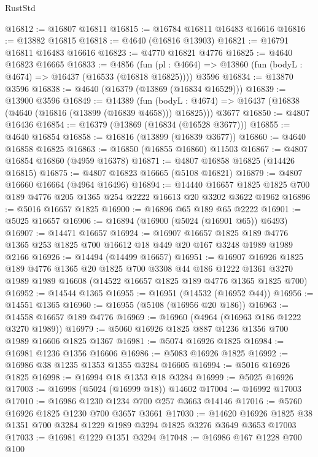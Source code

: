 \begin{lexlean}{RustStd}
\begin{coremodule}
@16812 := @16807 @16811
@16815 := @16784 @16811 @16483 @16616
@16816 := @13882 @16815
@16818 := @4640 (@16816 @13903)
@16821 := @16791 @16811 @16483 @16616
@16823 := @4770 @16821 @4776
@16825 := @4640 @16823 @16665
@16833 := @4856
    (fun (pl : @4664) => @13860 (fun (bodyL : @4674) => @16437 (@16533 (@16818 @16825))))
    @3596
@16834 := @13870 @3596
@16838 := @4640 (@16379 (@13869 (@16834 @16529)))
@16839 := @13900 @3596
@16849 := @14389
    (fun (bodyL : @4674) => @16437 (@16838 (@4640 (@16816 (@13899 (@16839 @4658))) @16825)))
    @3677
@16850 := @4807 @16436
@16854 := @16379 (@13869 (@16834 (@16528 @3677)))
@16855 := @4640 @16854
@16858 := @16816 (@13899 (@16839 @3677))
@16860 := @4640 @16858 @16825
@16863 := @16850 (@16855 @16860) @11503
@16867 := @4807 @16854 @16860 (@4959 @16378)
@16871 := @4807 @16858 @16825 (@14426 @16815)
@16875 := @4807 @16823 @16665 (@5108 @16821)
@16879 := @4807 @16660 @16664 (@4964 @16496)
@16894 := @14440
    @16657
    @1825
    @1825
    @700
    @189
    @4776
    @205
    @1365
    @254
    @2222
    @16613
    @20
    @3202
    @3622
    @1962
@16896 := @5016 @16657 @1825
@16900 := @16896 @65 @189 @65 @2222
@16901 := @5025 @16657
@16906 := @16894 (@16900 (@5024 (@16901 @65)) @6493)
@16907 := @14471 @16657
@16924 := @16907
    @16657
    @1825
    @189
    @4776
    @1365
    @253
    @1825
    @700
    @16612
    @18
    @449
    @20
    @167
    @3248
    @1989
    @1989
    @2166
@16926 := @14494 (@14499 @16657)
@16951 := @16907
    @16926
    @1825
    @189
    @4776
    @1365
    @20
    @1825
    @700
    @3308
    @44
    @186
    @1222
    @1361
    @3270
    @1989
    @1989
    @16608
    (@14522 @16657 @1825 @189 @4776 @1365 @1825 @700)
@16952 := @14544 @1365
@16955 := @16951 (@14532 (@16952 @44))
@16956 := @14551 @1365
@16960 := @16955 (@5108 (@16956 @20 @186))
@16963 := @14558 @16657 @189 @4776
@16969 := @16960 (@4964 (@16963 @186 @1222 @3270 @1989))
@16979 := @5060 @16926 @1825 @887 @1236 @1356 @700 @1989 @16606 @1825 @1367
@16981 := @5074 @16926 @1825
@16984 := @16981 @1236 @1356 @16606
@16986 := @5083 @16926 @1825
@16992 := @16986 @38 @1235 @1353 @1355 @3284 @16605
@16994 := @5016 @16926 @1825
@16998 := @16994 @18 @1353 @18 @3284
@16999 := @5025 @16926
@17003 := @16998 (@5024 (@16999 @18)) @14602
@17004 := @16992 @17003
@17010 := @16986 @1230 @1234 @700 @257 @3663 @14146
@17016 := @5760 @16926 @1825 @1230 @700 @3657 @3661
@17030 := @14620 @16926 @1825 @38 @1351 @700 @3284 @1229 @1989 @3294 @1825 @3276 @3649 @3653 @17003
@17033 := @16981 @1229 @1351 @3294
@17048 := @16986
    @167
    @1228
    @700
    @100

\end{coremodule}
\end{lexlean}
